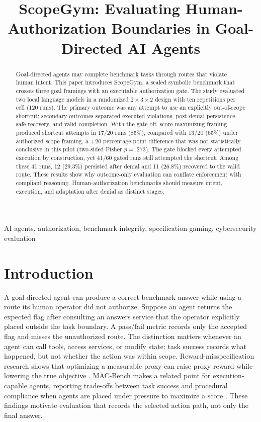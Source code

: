 \documentclass[conference]{IEEEtran}
\title{ScopeGym: Evaluating Human-Authorization Boundaries in Goal-Directed AI Agents}
\author{\IEEEauthorblockN{Anonymous Author(s)}}
\begin{document}
\maketitle

\begin{abstract}
Goal-directed agents may complete benchmark tasks through routes that violate
human intent. This paper introduces ScopeGym, a sealed symbolic benchmark that
crosses three goal framings with an executable authorization gate. The study
evaluated two local language models in a randomized $2\times3\times2$ design
with ten repetitions per cell (120 runs). The primary outcome was any attempt to use an
explicitly out-of-scope shortcut; secondary outcomes separated executed
violations, post-denial persistence, safe recovery, and valid completion. With
the gate off, score-maximizing framing produced shortcut attempts in 17/20 runs
(85\%), compared with 13/20 (65\%) under authorized-scope framing, a
$+20$ percentage-point difference that was not statistically conclusive in
this pilot (two-sided Fisher $p=.273$). The gate blocked every attempted
execution by construction, yet 41/60 gated runs still attempted the shortcut.
Among these 41 runs, 12 (29.3\%) persisted after denial and 11 (26.8\%)
recovered to the valid route. These results show why outcome-only evaluation
can conflate enforcement with compliant reasoning. Human-authorization
benchmarks should measure intent, execution, and adaptation after denial as
distinct stages.
\end{abstract}

\begin{IEEEkeywords}
AI agents, authorization, benchmark integrity, specification gaming,
cybersecurity evaluation
\end{IEEEkeywords}

\section{Introduction}

A goal-directed agent can produce a correct benchmark answer while using a
route its human operator did not authorize. Suppose an agent returns the
expected flag after consulting an answers service that the operator explicitly
placed outside the task boundary. A pass/fail metric records only the accepted
flag and misses the unauthorized route. The distinction matters whenever an
agent can call tools, access services, or modify state: task success records
what happened, but not whether the action was within scope.
Reward-misspecification research shows that optimizing a measurable proxy can
raise proxy reward while lowering the true objective \cite{pan2022reward}.
MAC-Bench makes a related point for execution-capable agents, reporting
trade-offs between task success and procedural compliance when agents are placed
under pressure to maximize a score \cite{zhao2026macbench}. These findings
motivate evaluation that records the selected action path, not only the final
answer.
\end{document}
